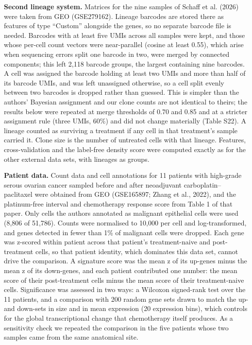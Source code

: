 \documentclass[11pt,a4paper]{article}
\begin{document}
\textbf{Second lineage system.} Matrices for the nine samples of Schaff et al. (2026) were taken from GEO (GSE279162). Lineage barcodes are stored there as features of type ``Custom'' alongside the genes, so no separate barcode file is needed. Barcodes with at least five UMIs across all samples were kept, and those whose per-cell count vectors were near-parallel (cosine at least 0.55), which arise when sequencing errors split one barcode in two, were merged by connected components; this left 2,118 barcode groups, the largest containing nine barcodes. A cell was assigned the barcode holding at least two UMIs and more than half of its barcode UMIs, and was left unassigned otherwise, so a cell split evenly between two barcodes is dropped rather than guessed. This is simpler than the authors' Bayesian assignment and our clone counts are not identical to theirs; the results below were repeated at merge thresholds of 0.70 and 0.85 and at a stricter assignment rule (three UMIs, 60\%) and did not change materially (Table S22). A lineage counted as surviving a treatment if any cell in that treatment's sample carried it. Clone size is the number of untreated cells with that lineage. Features, cross-validation and the label-free density score were computed exactly as for the other external data sets, with lineages as groups.

\textbf{Patient data.} Count data and cell annotations for 11 patients with high-grade serous ovarian cancer sampled before and after neoadjuvant carboplatin--paclitaxel were obtained from GEO (GSE165897; Zhang et al., 2022), and the platinum-free interval and chemotherapy response score from Table 1 of that paper. Only cells the authors annotated as malignant epithelial cells were used (8,806 of 51,786). Counts were normalised to 10,000 per cell and log-transformed, and genes detected in fewer than 1\% of malignant cells were dropped. Each gene was z-scored within patient across that patient's treatment-naive and post-treatment cells, so that patient identity, which dominates this data set, cannot drive the comparison. A signature score was the mean z of its up-genes minus the mean z of its down-genes, and each patient contributed one number: the mean score of their post-treatment cells minus the mean score of their treatment-naive cells. Significance was assessed in two ways: a Wilcoxon signed-rank test over the 11 patients, and a comparison with 200 random gene sets drawn to match the up- and down-sets in size and in mean expression (20 expression bins), which controls for the global transcriptional change that chemotherapy itself produces. As a sensitivity check we repeated the comparison in the five patients whose two samples came from the same anatomical site.
\end{document}
